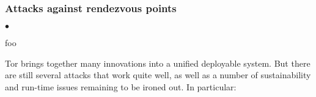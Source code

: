 \documentclass[times,10pt,twocolumn]{article}
\newenvironment{tightlist}{\begin{list}{$\bullet$}{
  \setlength{\itemsep}{0mm}
    \setlength{\parsep}{0mm}
    }}{\end{list}}
\begin{document}
\subsubsection*{Attacks against rendezvous points}
\begin{tightlist}
\item foo
\end{tightlist}



\label{sec:conclusion}


Tor brings together many innovations into
a unified deployable system. But there are still several attacks that
work quite well, as well as a number of sustainability and run-time
issues remaining to be ironed out. In particular:
\end{document}
